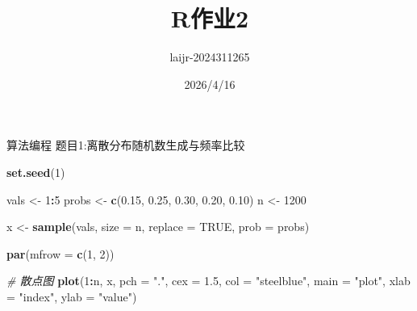 \documentclass[
]{article}
\title{R作业2}
\author{laijr-2024311265}
\date{2026/4/16}
\newenvironment{Shaded}{\begin{snugshade}}{\end{snugshade}}
\newcommand{\AttributeTok}[1]{\textcolor[rgb]{0.13,0.29,0.53}{#1}}
\newcommand{\CommentTok}[1]{\textcolor[rgb]{0.56,0.35,0.01}{\textit{#1}}}
\newcommand{\ConstantTok}[1]{\textcolor[rgb]{0.56,0.35,0.01}{#1}}
\newcommand{\DecValTok}[1]{\textcolor[rgb]{0.00,0.00,0.81}{#1}}
\newcommand{\FloatTok}[1]{\textcolor[rgb]{0.00,0.00,0.81}{#1}}
\newcommand{\FunctionTok}[1]{\textcolor[rgb]{0.13,0.29,0.53}{\textbf{#1}}}
\newcommand{\NormalTok}[1]{#1}
\newcommand{\OtherTok}[1]{\textcolor[rgb]{0.56,0.35,0.01}{#1}}
\newcommand{\SpecialCharTok}[1]{\textcolor[rgb]{0.81,0.36,0.00}{\textbf{#1}}}
\newcommand{\StringTok}[1]{\textcolor[rgb]{0.31,0.60,0.02}{#1}}
\begin{document}
\maketitle

算法编程 题目1:离散分布随机数生成与频率比较

\begin{Shaded}
\begin{Highlighting}[]
\FunctionTok{set.seed}\NormalTok{(}\DecValTok{1}\NormalTok{)}

\NormalTok{vals  }\OtherTok{\textless{}{-}} \DecValTok{1}\SpecialCharTok{:}\DecValTok{5}
\NormalTok{probs }\OtherTok{\textless{}{-}} \FunctionTok{c}\NormalTok{(}\FloatTok{0.15}\NormalTok{, }\FloatTok{0.25}\NormalTok{, }\FloatTok{0.30}\NormalTok{, }\FloatTok{0.20}\NormalTok{, }\FloatTok{0.10}\NormalTok{)}
\NormalTok{n     }\OtherTok{\textless{}{-}} \DecValTok{1200}

\NormalTok{x }\OtherTok{\textless{}{-}} \FunctionTok{sample}\NormalTok{(vals, }\AttributeTok{size =}\NormalTok{ n, }\AttributeTok{replace =} \ConstantTok{TRUE}\NormalTok{, }\AttributeTok{prob =}\NormalTok{ probs)}

\FunctionTok{par}\NormalTok{(}\AttributeTok{mfrow =} \FunctionTok{c}\NormalTok{(}\DecValTok{1}\NormalTok{, }\DecValTok{2}\NormalTok{))}

\CommentTok{\# 散点图}
\FunctionTok{plot}\NormalTok{(}\DecValTok{1}\SpecialCharTok{:}\NormalTok{n, x,}
     \AttributeTok{pch  =} \StringTok{"."}\NormalTok{, }\AttributeTok{cex =} \FloatTok{1.5}\NormalTok{,}
     \AttributeTok{col  =} \StringTok{"steelblue"}\NormalTok{,}
     \AttributeTok{main =} \StringTok{"plot"}\NormalTok{,}
     \AttributeTok{xlab =} \StringTok{"index"}\NormalTok{, }\AttributeTok{ylab =} \StringTok{"value"}\NormalTok{)}


\end{Highlighting}
\end{Shaded}
\end{document}
